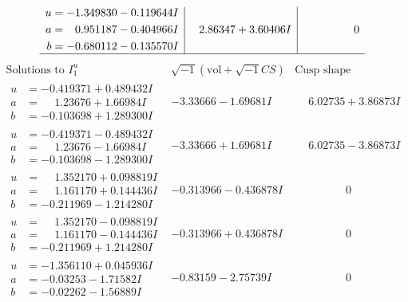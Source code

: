 \documentclass[1p]{elsarticle_modified}
\theoremstyle{definition}
\newcommand{\I}{\sqrt{-1}}
\begin{document}
$$\begin{array}{c|c|c}
\begin{aligned}
u &= -1.349830 - 0.119644 I \\
a &= \phantom{-}0.951187 - 0.404966 I \\
b &= -0.680112 - 0.135570 I\end{aligned}
 & \phantom{-}2.86347 + 3.60406 I & \phantom{-0.000000 } 0\\
 \hline 
 \end{array}$$\newpage$$\begin{array}{c|c|c}  
\text{Solutions to }I^u_{1}& \I (\text{vol} + \sqrt{-1}CS) & \text{Cusp shape}\\
 \hline 
\begin{aligned}
u &= -0.419371 + 0.489432 I \\
a &= \phantom{-}1.23676 + 1.66984 I \\
b &= -0.103698 + 1.289300 I\end{aligned}
 & -3.33666 - 1.69681 I & \phantom{-}6.02735 + 3.86873 I \\ \hline\begin{aligned}
u &= -0.419371 - 0.489432 I \\
a &= \phantom{-}1.23676 - 1.66984 I \\
b &= -0.103698 - 1.289300 I\end{aligned}
 & -3.33666 + 1.69681 I & \phantom{-}6.02735 - 3.86873 I \\ \hline\begin{aligned}
u &= \phantom{-}1.352170 + 0.098819 I \\
a &= \phantom{-}1.161170 + 0.144436 I \\
b &= -0.211969 - 1.214280 I\end{aligned}
 & -0.313966 - 0.436878 I & \phantom{-0.000000 } 0 \\ \hline\begin{aligned}
u &= \phantom{-}1.352170 - 0.098819 I \\
a &= \phantom{-}1.161170 - 0.144436 I \\
b &= -0.211969 + 1.214280 I\end{aligned}
 & -0.313966 + 0.436878 I & \phantom{-0.000000 } 0 \\ \hline\begin{aligned}
u &= -1.356110 + 0.045936 I \\
a &= -0.03253 - 1.71582 I \\
b &= -0.02262 - 1.56889 I\end{aligned}
 & -0.83159 - 2.75739 I & \phantom{-0.000000 } 0 \\ \hline\begin{aligned}

\end{aligned}
\end{array}$$
\end{document}
